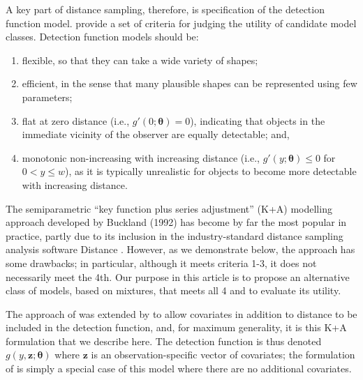 \documentclass[useAMS,referee,usenatbib]{biom}
\begin{document}
A key part of distance sampling, therefore, is specification of the detection function model.  \citet[][Chapter 2]{Buckland:2001vm} provide a set of criteria for judging the utility of candidate model classes. Detection function models should be:
\begin{enumerate}
\item flexible, so that they can take a wide variety of shapes;
\item efficient, in the sense that many plausible shapes can be represented using few parameters;
\item flat at zero distance (i.e., $g'(0;\bm{\theta})=0$), indicating that objects in the immediate vicinity of the observer are equally detectable; and,
\item monotonic non-increasing with increasing distance (i.e., $g'(y;\bm{\theta}) \leq 0$ for $0<y\leq w$), as it is typically unrealistic for objects to become more detectable with increasing distance.
\end{enumerate}
The semiparametric ``key function plus series adjustment'' (K+A) modelling approach developed by Buckland (1992) has become by far the most popular in practice, partly due to its inclusion in the industry-standard distance sampling analysis software Distance \citep{Thomas:2010cf}.  However, as we demonstrate below, the approach has some drawbacks; in particular, although it meets criteria 1-3, it does not necessarily meet the 4th.  Our purpose in this article is to propose an alternative class of models, based on mixtures, that meets all 4 and to evaluate its utility.  

The approach of \cite{Buckland:1992wy} was extended by \cite{Marques:2003vb} to allow covariates in addition to distance to be included in the detection function, and, for maximum generality, it is this K+A formulation that we describe here.  The detection function is thus denoted $g(y, \mathbf{z};\bm{\theta})$ where $\mathbf{z}$ is an observation-specific vector of covariates; the formulation of \cite{Buckland:1992wy} is simply a special case of this model where there are no additional covariates. 
\end{document}
